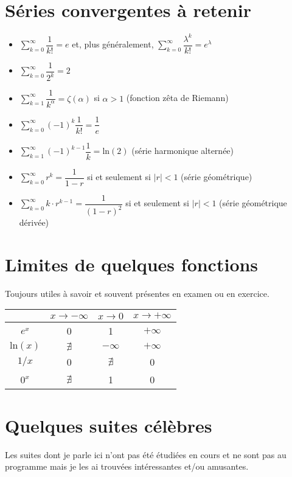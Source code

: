 \documentclass[10pt,a4paper]{book}
\begin{document}
\section{Séries convergentes à retenir}
\begin{itemize}
\item $\sum_{k=0}^\infty \dfrac{1}{k!} = e$ et, plus généralement, $\sum_{k=0}^\infty \dfrac{\lambda^k}{k!} = e^\lambda$
\item $\sum_{k=0}^\infty \dfrac{1}{2^k} = 2$
\item $\sum_{k=1}^\infty \dfrac{1}{k^\alpha} = \zeta(\alpha)$ si $\alpha > 1$ (fonction zêta de Riemann)
\item $\sum_{k=0}^\infty (-1)^k\dfrac{1}{k!} = \dfrac{1}{e}$
\item $\sum_{k=1}^\infty (-1)^{k-1} \dfrac{1}{k} = \text{ln}(2)$ (série harmonique alternée)
\item $\sum_{k=0}^\infty r^k = \dfrac{1}{1-r}$ si et seulement si $|r|<1$ (série géométrique)
\item $\sum_{k=0}^\infty k\cdot r^{k-1} = \dfrac{1}{(1-r)^2}$ si et seulement si $|r|<1$ (série géométrique dérivée)
\end{itemize}

\section{Limites de quelques fonctions}
Toujours utiles à savoir et souvent présentes en examen ou en exercice.\\
\begin{tabular}{ |c || c | c | c| }
\hline
 & $x\to-\infty$ & $x\to0$  & $x\to+\infty$ \\
 \hline 
 $e^x$ & 0 & 1 & $+\infty$ \\  
 $\text{ln}(x)$ & $\nexists$ & $-\infty$ & $+\infty$ \\
 $1/x$ & 0 & $\nexists$ & 0 \\
 $0^x$ & $\nexists$ & 1 & 0 \\
 \hline
\end{tabular}

\section{Quelques suites célèbres}
Les suites dont je parle ici n'ont pas été étudiées en cours et ne sont pas au programme mais je les ai trouvées intéressantes et/ou amusantes.
\end{document}
